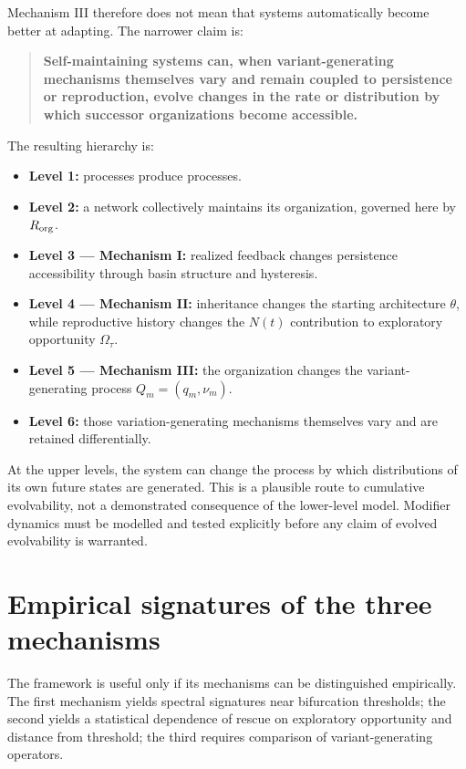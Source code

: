 \documentclass[11pt,a4paper]{article}
\providecommand{\tightlist}{%
  \setlength{\itemsep}{0pt}\setlength{\parskip}{0pt}}
\begin{document}
Mechanism III therefore does not mean that systems automatically become
better at adapting. The narrower claim is:

\begin{quote}
\textbf{Self-maintaining systems can, when variant-generating mechanisms
themselves vary and remain coupled to persistence or reproduction,
evolve changes in the rate or distribution by which successor
organizations become accessible.}
\end{quote}

The resulting hierarchy is:

\begin{itemize}
\tightlist
\item
  \textbf{Level 1:} processes produce processes.
\item
  \textbf{Level 2:} a network collectively maintains its organization,
  governed here by \(R_{\rm org}\).
\item
  \textbf{Level 3 --- Mechanism I:} realized feedback changes
  persistence accessibility through basin structure and hysteresis.
\item
  \textbf{Level 4 --- Mechanism II:} inheritance changes the starting
  architecture \(\theta\), while reproductive history changes the
  \(N(t)\) contribution to exploratory opportunity \(\Omega_\tau\).
\item
  \textbf{Level 5 --- Mechanism III:} the organization changes the
  variant-generating process \(Q_m=(q_m,\nu_m)\).
\item
  \textbf{Level 6:} those variation-generating mechanisms themselves
  vary and are retained differentially.
\end{itemize}

At the upper levels, the system can change the process by which
distributions of its own future states are generated. This is a
plausible route to cumulative evolvability, not a demonstrated
consequence of the lower-level model. Modifier dynamics must be modelled
and tested explicitly before any claim of evolved evolvability is
warranted.

\section{Empirical signatures of the three
mechanisms}\label{empirical-signatures-of-the-three-mechanisms}

The framework is useful only if its mechanisms can be distinguished
empirically. The first mechanism yields spectral signatures near
bifurcation thresholds; the second yields a statistical dependence of
rescue on exploratory opportunity and distance from threshold; the third
requires comparison of variant-generating operators.
\end{document}
